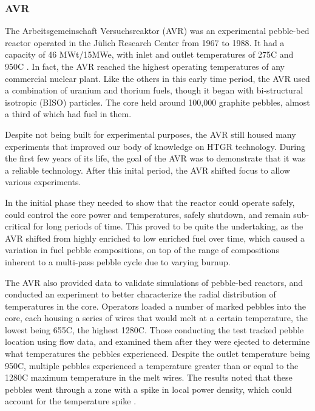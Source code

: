 \subsubsection{AVR}

The Arbeitsgemeinschaft Versuchsreaktor (AVR) was an experimental pebble-bed reactor operated in the Jülich Research Center from 1967 to 1988.  It had a capacity of 46 MWt/15MWe, with inlet and outlet temperatures of 275\textdegree  C and 950\textdegree  C \cite{beck_high_nodate}.  In fact, the AVR reached the highest operating temperatures of any commercial nuclear plant.  Like the others in this early time period, the AVR used a combination of uranium and thorium fuels, though it began with bi-structural isotropic (BISO) particles.  The core held around 100,000 graphite pebbles, almost a third of which had fuel in them.

Despite not being built for experimental purposes, the AVR still housed many experiments that improved our body of knowledge on HTGR technology.  During the first few years of its life, the goal of the AVR was to demonstrate that it was a reliable technology.  After this inital period, the AVR shifted focus to allow various experiments.

In the initial phase they needed to show that the reactor could operate safely, could control the core power and temperatures, safely shutdown, and remain sub-critical for long periods of time.  This proved to be quite the undertaking, as the AVR shifted from highly enriched to low enriched fuel over time, which caused a variation in fuel pebble compositions, on top of the range of compositions inherent to a multi-pass pebble cycle due to varying burnup.

The AVR also provided data to validate simulations of pebble-bed reactors, and conducted an experiment to better characterize the radial distribution of temperatures in the core.  Operators loaded a number of marked pebbles into the core, each housing a series of wires that would melt at a certain temperature, the lowest being 655\textdegree  C, the highest 1280\textdegree  C.  Those conducting the test tracked pebble location using flow data, and examined them after they were ejected to determine what temperatures the pebbles experienced.  Despite the outlet temperature being 950\textdegree  C, multiple pebbles experienced a temperature greater than or equal to the 1280\textdegree C maximum temperature in the melt wires.  The results noted that these pebbles went through a zone with a spike in local power density, which could account for the temperature spike \cite{noauthor_results_1990}.

